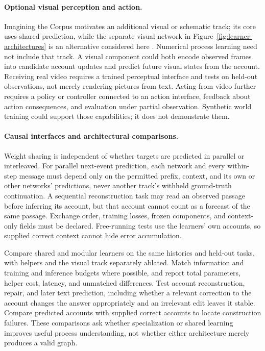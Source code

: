 \documentclass[10pt]{article}
\begin{document}
\paragraph{Optional visual perception and action.}
Imagining the Corpus motivates an additional visual or schematic track; its
core uses shared prediction, while the separate visual network in
Figure~\ref{fig:learner-architectures} is an alternative considered here
\cite{westerbergImagining2026}. Numerical process learning need not include
that track. A visual component could both encode observed frames into
candidate account updates and predict future visual states from the account.
Receiving real video requires a trained perceptual interface and tests on
held-out observations, not merely rendering pictures from text. Acting from
video further requires a policy or controller connected to an action interface,
feedback about action consequences, and evaluation under partial observation.
Synthetic world training could support
those capabilities; it does not demonstrate them.

\paragraph{Causal interfaces and architectural comparisons.}
Weight sharing is independent of whether targets are predicted in parallel
or interleaved. For parallel next-event prediction, each network and every
within-step message must depend only on the permitted prefix, context, and
its own or other networks' predictions, never another track's withheld
ground-truth continuation. A sequential reconstruction task may read an
observed passage before inferring its account, but that account cannot count
as a forecast of the same passage. Exchange order, training losses, frozen
components, and context-only fields must be declared. Free-running tests use
the learners' own accounts, so supplied correct context cannot hide error
accumulation.

Compare shared and modular learners on the same histories and held-out tasks,
with helpers and the visual track separately ablated. Match information and
training and inference budgets where possible, and report total parameters,
helper cost, latency, and unmatched differences. Test account reconstruction,
repair, and later text prediction, including whether a relevant correction to
the account changes the answer appropriately and an irrelevant edit leaves it
stable. Compare predicted accounts with supplied correct accounts to locate
construction failures. These comparisons ask whether specialization or shared
learning improves useful process understanding, not whether either architecture
merely produces a valid graph.

\begingroup
\small
\sloppy
\hfuzz=1pt
\setlength{\emergencystretch}{3em}
\setlength{\multicolsep}{6pt}


\endgroup
\end{document}
